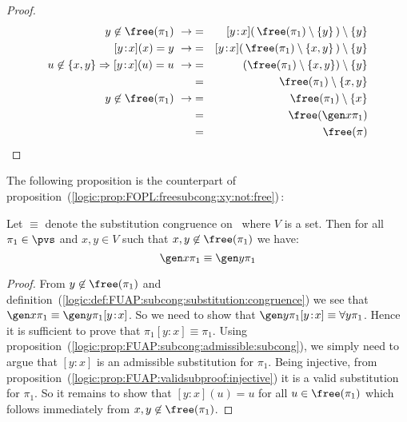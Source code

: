 \begin{proof}
\begin{eqnarray*}
    y\not\in\free(\pi_{1})\ \rightarrow
    &=&[y\!:\!x](\,\free(\pi_{1})\setminus\{y\}\,)\setminus\{y\}\\
    \mbox{$[y\!:\!x](x)=y$}\ \rightarrow
    &=&[y\!:\!x](\,\free(\pi_{1})\setminus\{x,y\}\,)\setminus\{y\}\\
    \mbox{$u\not\in\{x,y\}\Rightarrow[y\!:\!x](u)=u$}\ \rightarrow
    &=&(\free(\pi_{1})\setminus\{x,y\})\setminus\{y\}\\
    &=&\free(\pi_{1})\setminus\{x,y\}\\
    y\not\in\free(\pi_{1})\ \rightarrow
    &=&\free(\pi_{1})\setminus\{x\}\\
    &=&\free(\gen x\pi_{1})\\
    &=&\free(\pi)\\
    \end{eqnarray*}
\end{proof}

The following proposition is the counterpart of
proposition~(\ref{logic:prop:FOPL:freesubcong:xy:not:free})\,:
\begin{prop}\label{logic:prop:FUAP:charsubcong:xy:not:free}
Let $\equiv$ denote the substitution congruence on \pvs\ where $V$
is a set. Then for all $\pi_{1}\in\pvs$ and $x,y\in V$ such that
$x,y\not\in\free(\pi_{1})$ we have:
    \[
    \gen x\pi_{1}\equiv\gen y\pi_{1}
    \]
\end{prop}
\begin{proof}
From $y\not\in\free(\pi_{1})$ and
definition~(\ref{logic:def:FUAP:subcong:substitution:congruence}) we
see that $\gen x\pi_{1}\equiv\gen y\pi_{1}[y\!:\!x]$. So we need to
show that $\gen y\pi_{1}[y\!:\!x]\equiv\forall y\pi_{1}$. Hence it
is sufficient to prove that $\pi_{1}[y\!:\!x]\equiv\pi_{1}$. Using
proposition~(\ref{logic:prop:FUAP:subcong:admissible:subcong}), we
simply need to argue that $[y\!:\!x]$ is an admissible substitution
for $\pi_{1}$. Being injective, from
proposition~(\ref{logic:prop:FUAP:validsubproof:injective}) it is a
valid substitution for $\pi_{1}$. So it remains to show that
$[y\!:\!x](u)=u$ for all $u\in\free(\pi_{1})$ which follows
immediately from $x,y\not\in\free(\pi_{1})$.
\end{proof}


